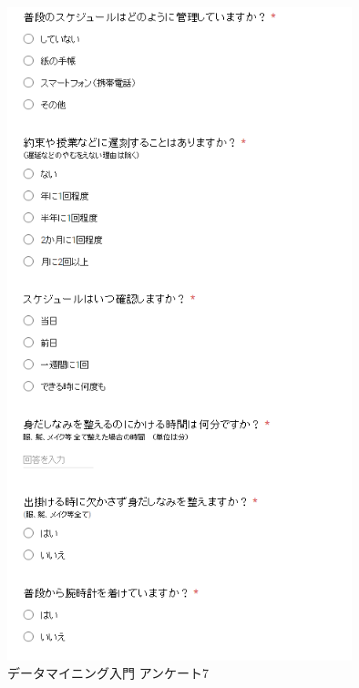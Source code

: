 \begin{figure}[p]
\centering
\includegraphics[width=10cm]{forms7.PNG}
\caption{データマイニング入門 アンケート7}\label{サンプル図}
\end{figure}

